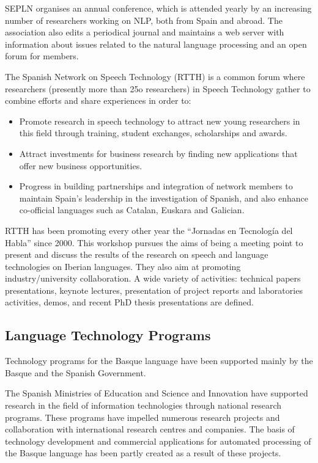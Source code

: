 \begin{multicols}{2}
SEPLN organises an annual conference, which is attended yearly by an increasing number of researchers working on NLP, both from Spain and abroad. The association also edits a periodical journal and maintains a web server with information about issues related to the natural language processing and an open forum for members.

The Spanish Network on Speech Technology (RTTH) \cite{BAS-Nota36}  is a common forum where researchers (presently more than 25o researchers) in Speech Technology gather to combine efforts and share experiences in order to:
\begin{itemize}

       \item Promote research in speech technology to attract new young researchers in this field through training, student exchanges, scholarships and awards.
       
       \item Attract investments for business research by finding new applications that offer new business opportunities.  
      
      \item Progress in building partnerships and integration of network members to maintain Spain's leadership in the investigation of Spanish, and also enhance co-official languages such as Catalan, Euskara and Galician.

\end{itemize}

RTTH has been promoting every other year the “Jornadas en Tecnología del Habla” since 2000. This workshop pursues the aims of being a meeting point to present and discuss the results of the research on speech and language technologies on Iberian languages. They also aim at promoting industry/university collaboration. A wide variety of activities: technical papers presentations, keynote lectures, presentation of project reports and laboratories activities, demos, and recent PhD thesis presentations are defined.

\subsection{Language Technology Programs}
    Technology programs for the Basque language have been supported mainly by the Basque and the Spanish Government. 

The Spanish Ministries of Education and Science and Innovation have supported research in the field of information technologies through national research programs. These programs have impelled numerous research projects and collaboration with international research centres and companies. The basis of technology development and commercial applications for automated processing of the Basque language has been partly created as a result of these projects.


\end{multicols}
